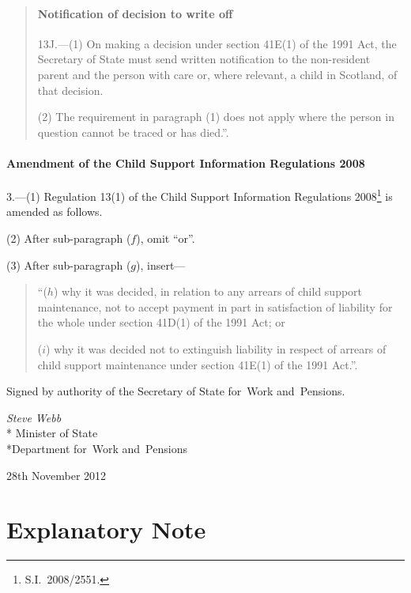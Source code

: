 \documentclass[12pt,a4paper]{article}
\begin{document}
\begin{quotation}
\subsection*{Notification of decision to write off}

13J.---(1)  On making a decision under section 41E(1) of the 1991 Act, the Secretary of State must send written notification to the non-resident parent and the person with care or, where relevant, a child in Scotland, of that decision.

(2) The requirement in paragraph (1) does not apply where the person in question cannot be traced or has died.”.
\end{quotation}

\subsection[3. Amendment of the Child Support Information Regulations 2008]{Amendment of the Child Support Information Regulations 2008}

3.---(1)  Regulation 13(1) of the Child Support Information Regulations 2008\footnote{S.I.~2008/2551.} is amended as follows.

(2) After sub-paragraph ($f$), omit “or”.

(3) After sub-paragraph ($g$), insert—
\begin{quotation}
“($h$) why it was decided, in relation to any arrears of child support maintenance, not to accept payment in part in satisfaction of liability for the whole under section 41D(1) of the 1991 Act; or

($i$) why it was decided not to extinguish liability in respect of arrears of child support maintenance under section 41E(1) of the 1991 Act.”. 
\end{quotation}

\bigskip

\pagebreak[3]

Signed 
by authority of the 
Secretary of State for~Work and~Pensions.

{\raggedleft
\emph{Steve Webb}\\*
Minister
of State\\*Department 
for~Work and~Pensions

}

28th November 2012

\small

\part{Explanatory Note}
\end{document}
